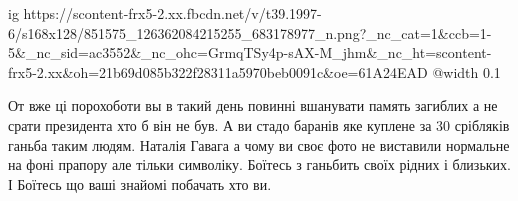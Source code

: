 
\ifcmt
  ig https://scontent-frx5-2.xx.fbcdn.net/v/t39.1997-6/s168x128/851575_126362084215255_683178977_n.png?_nc_cat=1&ccb=1-5&_nc_sid=ac3552&_nc_ohc=GrmqTSy4p-sAX-M_jhm&_nc_ht=scontent-frx5-2.xx&oh=21b69d085b322f28311a5970beb0091c&oe=61A24EAD
  @width 0.1
\fi


От вже ці порохоботи вы в такий день повинні вшанувати память загиблих а не
срати президента хто б він не був. А ви стадо баранів яке куплене за 30
срібляків ганьба таким людям. Наталія Гавага а чому ви своє фото не виставили
нормальне на фоні прапору але тільки символіку. Боїтесь з ганьбить своїх рідних
і близьких. І Боїтесь що ваші знайомі побачать хто ви.

